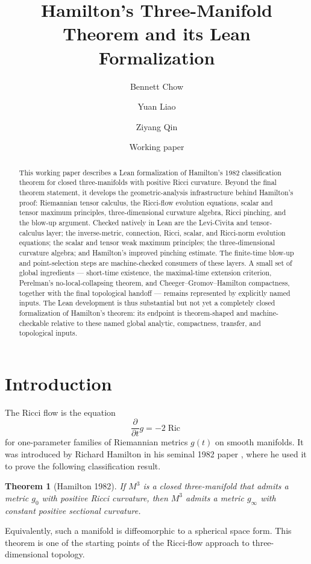 \documentclass[11pt]{article}
\title{Hamilton's Three-Manifold Theorem and its Lean Formalization}
\author{Bennett Chow \and Yuan Liao \and Ziyang Qin}
\date{Working paper}
\theoremstyle{plain}
\newtheorem{theorem}{Theorem}[section]
\theoremstyle{definition}
\theoremstyle{remark}
\newcommand{\Ric}{\operatorname{Ric}}
\begin{document}
\maketitle

\begin{abstract}
This working paper describes a Lean formalization of Hamilton's 1982
classification theorem for closed three-manifolds with positive Ricci
curvature.  Beyond the final theorem statement, it develops the
geometric-analysis infrastructure behind Hamilton's proof: Riemannian tensor
calculus, the Ricci-flow evolution equations, scalar and tensor maximum
principles, three-dimensional curvature algebra, Ricci pinching, and the
blow-up argument.  Checked natively in Lean are the Levi-Civita and
tensor-calculus layer; the inverse-metric, connection, Ricci, scalar, and
Ricci-norm evolution equations; the scalar and tensor weak maximum principles;
the three-dimensional curvature algebra; and Hamilton's improved pinching
estimate.  The finite-time blow-up and point-selection steps are machine-checked
consumers of these layers.  A small set of global ingredients --- short-time
existence, the maximal-time extension criterion, Perelman's no-local-collapsing
theorem, and Cheeger--Gromov--Hamilton compactness, together with the final
topological handoff --- remains represented by explicitly named inputs.  The Lean
development is thus substantial but not yet a completely closed formalization of
Hamilton's theorem: its endpoint is theorem-shaped and machine-checkable
relative to these named global analytic, compactness, transfer, and topological
inputs.
\end{abstract}

\tableofcontents

\section{Introduction}

The Ricci flow is the equation
\begin{equation}
    \frac{\partial}{\partial t} g = - 2 \Ric
\end{equation}
for one-parameter families of Riemannian metrics $g(t)$ on smooth manifolds.
It was introduced by Richard Hamilton in his seminal 1982 paper
\cite{MR664497}, where he used it to prove the following classification
result.
\begin{theorem}[Hamilton 1982]
   If $M^3$ is a closed three-manifold that admits a metric $g_0$ with positive
   Ricci curvature, then $M^3$ admits a metric $g_\infty$ with constant
   positive sectional curvature.
\end{theorem}
Equivalently, such a manifold is diffeomorphic to a spherical space form.  This
theorem is one of the starting points of the Ricci-flow approach to
three-dimensional topology.
\end{document}

